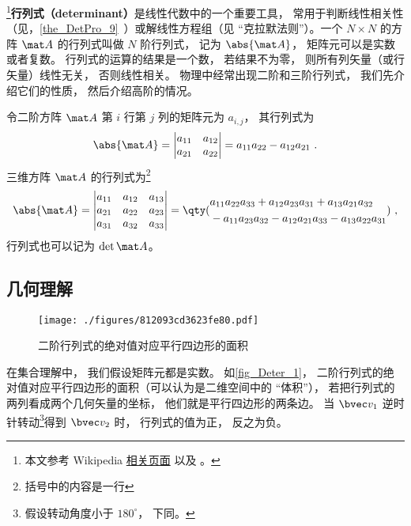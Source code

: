 

\footnote{本文参考 Wikipedia \href{https://en.wikipedia.org/wiki/Determinant}{相关页面} 以及 \cite{同济线}。}\textbf{行列式（determinant）}是线性代数中的一个重要工具， 常用于判断线性相关性（见，\autoref{the_DetPro_9}~）或解线性方程组（见 “克拉默法则”）。一个 $N\times N$ 的方阵 $\mat A$ 的行列式叫做 $N$ 阶行列式， 记为 $\abs{\mat A}$， 矩阵元可以是实数或者复数。 行列式的运算的结果是一个数， 若结果不为零， 则所有列矢量（或行矢量）线性无关， 否则线性相关。 物理中经常出现二阶和三阶行列式， 我们先介绍它们的性质， 然后介绍高阶的情况。

令二阶方阵 $\mat A$ 第 $i$ 行第 $j$ 列的矩阵元为 $a_{i,j}$， 其行列式为
\begin{equation}\label{eq_Deter_1}
\abs{\mat A} =
\begin{vmatrix}
a_{11} & a_{12} \\
a_{21} & a_{22}
\end{vmatrix} = a_{11}a_{22} - a_{12}a_{21}~.
\end{equation}
三维方阵 $\mat A$ 的行列式为\footnote{括号中的内容是一行}
\begin{equation}\label{eq_Deter_2}
\abs{\mat A} = 
\begin{vmatrix}
a_{11} & a_{12} & a_{13} \\
a_{21} & a_{22} & a_{23} \\
a_{31} & a_{32} & a_{33}
\end{vmatrix}
=
\qty(
\begin{aligned}
&a_{11}a_{22}a_{33} + a_{12}a_{23}a_{31} + a_{13}a_{21}a_{32} \\
&- a_{11}a_{23}a_{32} - a_{12}a_{21}a_{33} - a_{13}a_{22}a_{31}
\end{aligned}
)~,
\end{equation}
行列式也可以记为 $\det{\mat A}$。

\subsection{几何理解}

\begin{figure}[ht]
\centering
\texttt{[image: ./figures/812093cd3623fe80.pdf]}
\caption{二阶行列式的绝对值对应平行四边形的面积} \label{fig_Deter_1}
\end{figure}
在集合理解中， 我们假设矩阵元都是实数。 如\autoref{fig_Deter_1}， 二阶行列式的绝对值对应平行四边形的面积（可以认为是二维空间中的 “体积”）， 若把行列式的两列看成两个几何矢量的坐标， 他们就是平行四边形的两条边。 当 $\bvec v_1$ 逆时针转动\footnote{假设转动角度小于 $180^\circ$， 下同。}得到 $\bvec v_2$ 时， 行列式的值为正， 反之为负。

